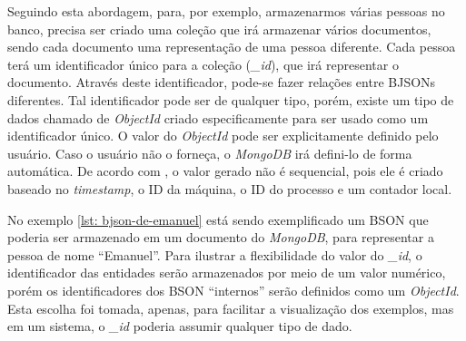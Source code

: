 Seguindo esta abordagem, para, por exemplo, armazenarmos várias pessoas no banco, precisa ser criado uma coleção que irá armazenar vários documentos, sendo cada documento uma representação de uma pessoa diferente. Cada pessoa terá um identificador único para a coleção (\textit{\_id}), que irá  representar o documento. Através deste identificador, pode-se fazer relações entre BJSONs diferentes. Tal identificador pode ser de qualquer tipo, porém, existe um tipo de dados chamado de \textit{ObjectId} criado especificamente para ser usado como um identificador único. O valor do \textit{ObjectId} pode ser explicitamente definido pelo usuário. Caso o usuário não o forneça, o \textit{MongoDB} irá defini-lo de forma automática. De acordo com , o valor gerado não é sequencial, pois ele é criado baseado no \textit{timestamp}, o ID da máquina, o ID do processo e um contador local.


    
    


No exemplo \ref{lst: bjson-de-emanuel} está sendo exemplificado um BSON que poderia ser armazenado em um documento do \textit{MongoDB}, para representar a pessoa de nome ``Emanuel''. Para ilustrar a flexibilidade do valor do \textit{\_id}, o identificador das entidades serão armazenados por meio de um valor numérico, porém os identificadores dos BSON ``internos'' serão definidos como um \textit{ObjectId}. Esta escolha foi tomada, apenas, para facilitar a visualização dos exemplos, mas em um sistema, o \textit{\_id} poderia assumir qualquer tipo de dado.

